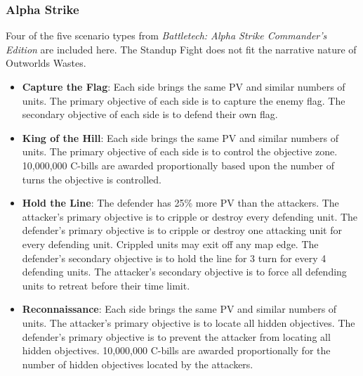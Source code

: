 \documentclass[UTF8]{article}
\begin{document}
\newpage

\subsubsection{Alpha Strike}

Four of the five scenario types from \emph{Battletech: Alpha Strike Commander's Edition} are included here.
The Standup Fight does not fit the narrative nature of Outworlds Wastes.\\

\begin{itemize}

\item {\bf Capture the Flag}: Each side brings the same PV and similar numbers of units.
The primary objective of each side is to capture the enemy flag.
The secondary objective of each side is to defend their own flag.

\item {\bf King of the Hill}: Each side brings the same PV and similar numbers of units.
The primary objective of each side is to control the objective zone.
10,000,000 C-bills are awarded proportionally based upon the number of turns the objective is controlled.

\item {\bf Hold the Line}: The defender has 25\% more PV than the attackers.
The attacker's primary objective is to cripple or destroy every defending unit.
The defender's primary objective is to cripple or destroy one attacking unit for every defending unit.
Crippled units may exit off any map edge.
The defender's secondary objective is to hold the line for 3 turn for every 4 defending units.
The attacker's secondary objective is to force all defending units to retreat before their time limit.

\item {\bf Reconnaissance}: Each side brings the same PV and similar numbers of units.
The attacker's primary objective is to locate all hidden objectives.
The defender's primary objective is to prevent the attacker from locating all hidden objectives.
10,000,000 C-bills are awarded proportionally for the number of hidden objectives located by the attackers.

\end{itemize}
\end{document}
